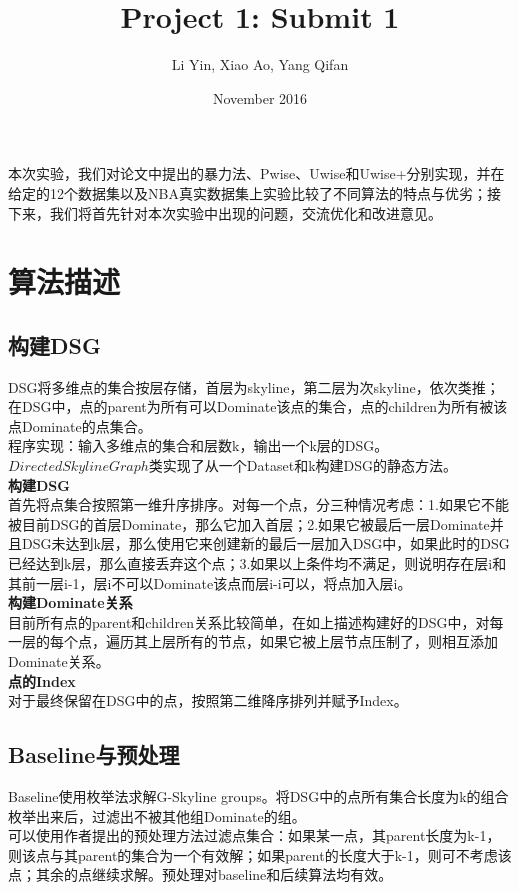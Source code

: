 \documentclass{article}
\title{Project 1: Submit 1}
\author{Li Yin, Xiao Ao, Yang Qifan}
\date{November 2016}
\begin{document}
\maketitle
\begin{CJK}{UTF8}{gbsn}  

本次实验，我们对论文中提出的暴力法、Pwise、Uwise和Uwise+分别实现，并在给定的12个数据集以及NBA真实数据集上实验比较了不同算法的特点与优劣；接下来，我们将首先针对本次实验中出现的问题，交流优化和改进意见。

\section{算法描述}

\subsection{构建DSG}
DSG将多维点的集合按层存储，首层为skyline，第二层为次skyline，依次类推；在DSG中，点的parent为所有可以Dominate该点的集合，点的children为所有被该点Dominate的点集合。\\
程序实现：输入多维点的集合和层数k，输出一个k层的DSG。\\
$DirectedSkylineGraph$类实现了从一个Dataset和k构建DSG的静态方法。\\
\textbf{构建DSG}\\
首先将点集合按照第一维升序排序。对每一个点，分三种情况考虑：1.如果它不能被目前DSG的首层Dominate，那么它加入首层；2.如果它被最后一层Dominate并且DSG未达到k层，那么使用它来创建新的最后一层加入DSG中，如果此时的DSG已经达到k层，那么直接丢弃这个点；3.如果以上条件均不满足，则说明存在层i和其前一层i-1，层i不可以Dominate该点而层i-i可以，将点加入层i。\\
\textbf{构建Dominate关系}\\
目前所有点的parent和children关系比较简单，在如上描述构建好的DSG中，对每一层的每个点，遍历其上层所有的节点，如果它被上层节点压制了，则相互添加Dominate关系。\\
\textbf{点的Index}\\
对于最终保留在DSG中的点，按照第二维降序排列并赋予Index。
\subsection{Baseline与预处理}
Baseline使用枚举法求解G-Skyline groups。将DSG中的点所有集合长度为k的组合枚举出来后，过滤出不被其他组Dominate的组。\\
可以使用作者提出的预处理方法过滤点集合：如果某一点，其parent长度为k-1，则该点与其parent的集合为一个有效解；如果parent的长度大于k-1，则可不考虑该点；其余的点继续求解。预处理对baseline和后续算法均有效。


\end{CJK}
\end{document}
